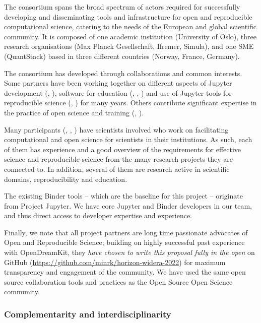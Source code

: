 The \TheProject consortium spans the broad spectrum of actors required for
successfully developing and disseminating tools and infrastructure for open and
reproducible computational science, catering to the needs of the European and
global scientific community. It is composed of one academic institution
(University of Oslo), three research organisations (Max Planck Gesellschaft, Ifremer,
Simula), and one SME (QuantStack) based in three different countries (Norway,
France, Germany).

The consortium has developed through collaborations and common interests. Some
partners have been working together on different aspects of Jupyter development
(, ), software for education (, ,
) and use of Jupyter tools for reproducible science (, )
for many years. Others contribute significant expertise in
the practice of open science and training (, ).

Many participants (, , ) have scientists involved who work on
facilitating computational and open science for scientists in their
institutions. As such, each of them has experience and a good overview of the
requirements for effective science and reproducible science from the many
research projects they are connected to. In addition, several of them are
research active in scientific domains, reproducibility and education.

The existing Binder tools -- which are the baseline for this project --
originate from Project Jupyter. We have core Jupyter and Binder developers in
our team, and thus direct access to developer expertise and experience.

Finally, we note that all project partners are long time passionate advocates of
Open and Reproducible Science; building on highly successful past experience
with OpenDreamKit, they \emph{have chosen to write this proposal fully in the
  open} on GitHub
(\href{https://github.com/minrk/horizon-widera-2022}{https://github.com/minrk/horizon-widera-2022})
for maximum transparency and engagement of the community. We have used the same
open source collaboration tools and practices as the Open Source Open Science
community.

\subsubsection{Complementarity and interdisciplinarity}
\label{sec:complementarity-and-interdisciplinarity}

